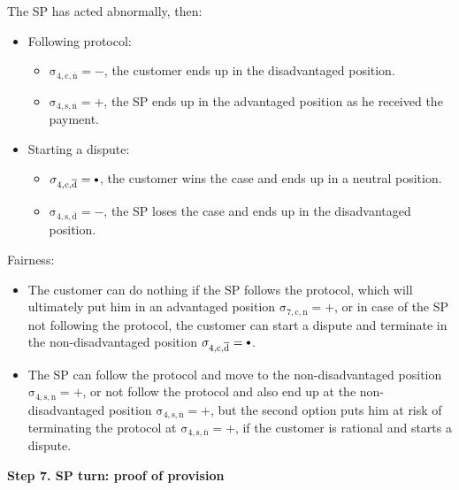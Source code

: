 \documentclass{ieeeaccess}
\newcommand\sbullet[1][.75]{\mathbin{\ThisStyle{\vcenter{\hbox{%
  \scalebox{#1}{$\SavedStyle\bullet$}}}}}%
}
\begin{document}
The SP has acted abnormally, then:

\begin{itemize}
\item
  Following protocol:

  \begin{itemize}
  
  \item
    \(\operatorname{\sigma_{4, c, \overline{n}} = -}\), the customer ends up in the disadvantaged position. 
  \item
    \(\operatorname{\sigma_{4, s, \overline{n}} = +}\), the SP ends up in the advantaged position as he received the payment. 
  \end{itemize}
\item
  Starting a dispute:

  \begin{itemize}
  
  \item
    \(\operatorname{\sigma_{4, c, \overline{d}} = \sbullet}\), the customer wins the case and ends up in a neutral position. 
  \item
    \(\operatorname{\sigma_{4, s, \overline{d}} = -}\), the SP loses the case and ends up in the disadvantaged position. 
  \end{itemize}
\end{itemize}

Fairness:

\begin{itemize}

\item
  The customer can do nothing if the SP follows the protocol, which will ultimately put him in an advantaged position \(\operatorname{\sigma_{7, c, n} = +}\), or in case of the SP not following the protocol, the customer can start a dispute and terminate in the non-disadvantaged position \(\operatorname{\sigma_{4, c, \overline{d}} = \sbullet}\).
\item
  The SP can follow the protocol and move to the non-disadvantaged position \(\operatorname{\sigma_{4, s, n} = +}\), or not follow the protocol and also end up at the non-disadvantaged position \(\operatorname{\sigma_{4, s, \overline{n}} = +}\), but the second option puts him at risk of terminating the protocol at \(\operatorname{\sigma_{4, s, \overline{n}} = +}\), if the customer is rational and starts a dispute.
\end{itemize}

\noindent \textbf
{Step 7. SP turn: proof of provision}\label{step-7-publication-of-proof-of-provision}
\end{document}
